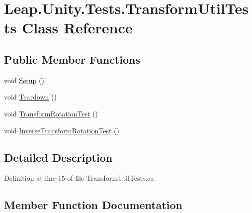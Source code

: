 \hypertarget{class_leap_1_1_unity_1_1_tests_1_1_transform_util_tests}{}\section{Leap.\+Unity.\+Tests.\+Transform\+Util\+Tests Class Reference}
\label{class_leap_1_1_unity_1_1_tests_1_1_transform_util_tests}
\subsection*{Public Member Functions}
\begin{DoxyCompactItemize}
\item 
void \mbox{\hyperlink{class_leap_1_1_unity_1_1_tests_1_1_transform_util_tests_abf48c82570a14d1f7afda726811af176}{Setup}} ()
\item 
void \mbox{\hyperlink{class_leap_1_1_unity_1_1_tests_1_1_transform_util_tests_adb2d1af83326a798e02e511671c97622}{Teardown}} ()
\item 
void \mbox{\hyperlink{class_leap_1_1_unity_1_1_tests_1_1_transform_util_tests_af0a56cc42f436b16a73730c2e848c11a}{Transform\+Rotation\+Test}} ()
\item 
void \mbox{\hyperlink{class_leap_1_1_unity_1_1_tests_1_1_transform_util_tests_ac85a9fc1586adc8f7a48085272473e51}{Inverse\+Transform\+Rotation\+Test}} ()
\end{DoxyCompactItemize}


\subsection{Detailed Description}


Definition at line 15 of file Transform\+Util\+Tests.\+cs.



\subsection{Member Function Documentation}
\mbox{\label{class_leap_1_1_unity_1_1_tests_1_1_transform_util_tests_ac85a9fc1586adc8f7a48085272473e51}} 

